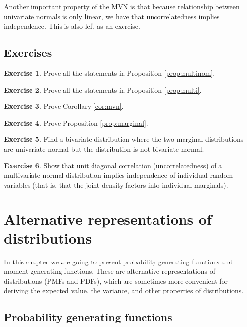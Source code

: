 \documentclass{book}
\theoremstyle{plain}%
\theoremstyle{definition}
\newtheorem{exercise}{Exercise}[chapter]
\begin{document}
Another important property of the MVN is that because relationship between univariate normals is only linear, we have that uncorrelatedness implies independence. This is also left as an exercise.


\section*{Exercises}

\begin{exercise}
Prove all the statements in Proposition \ref{prop:multinom}.
\end{exercise}


\begin{exercise}
Prove all the statements in Proposition \ref{prop:multi}.
\end{exercise}

\begin{exercise}
Prove Corollary \ref{cor:mvn}.
\end{exercise}

\begin{exercise}
Prove Proposition \ref{prop:marginal}.
\end{exercise}

\begin{exercise}
Find a bivariate distribution where the two marginal distributions are univariate normal but the distribution is not bivariate normal.
\end{exercise}

\begin{exercise}
Show that unit diagonal correlation (uncorrelatedness) of a multivariate normal distribution implies independence of individual random variables (that is, that the joint density factors into individual marginals).
\end{exercise}


\chapter{Alternative representations of distributions}

In this chapter we are going to present probability generating functions and moment generating functions. These are alternative representations of distributions (PMFs and PDFs), which are sometimes more convenient for deriving the expected value, the variance, and other properties of distributions.

\section{Probability generating functions}
\end{document}

